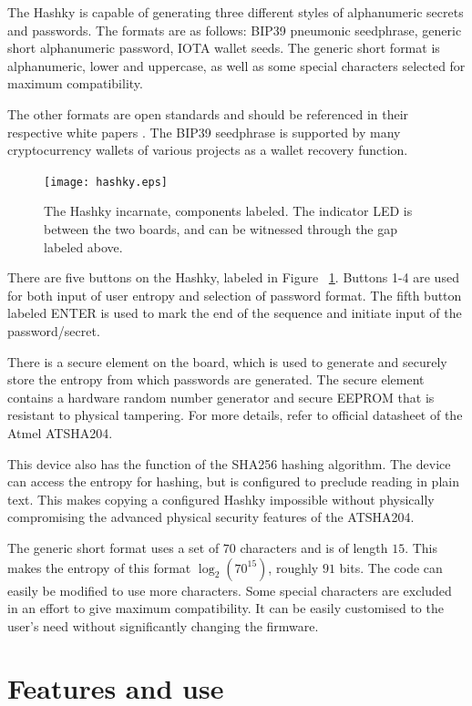 \documentclass{article}
\begin{document}
The Hashky is capable of generating three different styles of alphanumeric secrets and passwords. The formats are as follows: BIP39 pneumonic seedphrase, generic short alphanumeric password, IOTA wallet seeds. The generic short format is alphanumeric, lower and uppercase, as well as some special characters selected for maximum compatibility. 

The other formats are open standards and should be referenced in their respective white papers \cite{bip39,iota}. The BIP39 seedphrase is supported by many cryptocurrency wallets of various projects as a wallet recovery function.  


\begin{figure}
\centering
 \captionsetup{width=.7\linewidth}
\texttt{[image: hashky.eps]}
\caption{The Hashky incarnate, components labeled. The indicator LED is between the two boards, and can be witnessed through the gap labeled above. }
\label{fig:key}
\end{figure}

There are five buttons on the Hashky, labeled in Figure ~\ref{fig:key}. Buttons 1-4 are used for both input of user entropy and selection of password format. The fifth button labeled ENTER is used to mark the end of the sequence and initiate input of the password/secret. 

There is a secure element on the board, which is used to generate and securely store the entropy from which passwords are generated. The secure element contains a hardware random number generator and secure EEPROM that is resistant to physical tampering. For more details, refer to official datasheet of the Atmel ATSHA204. 

This device also has the function of the SHA256 hashing algorithm. The device can access the entropy for hashing, but is configured to preclude reading in plain text. This makes copying a configured Hashky impossible without physically compromising the advanced physical security features of the ATSHA204. 

The generic short format uses a set of $70$ characters and is of length $15$. This makes the entropy of this format $\log_2(70^{15})$, roughly $91$ bits. The code can easily be modified to use more characters. Some special characters are excluded in an effort to give maximum compatibility. It can be easily customised to the user's need without significantly changing the firmware.


\section{Features and use}
\end{document}
